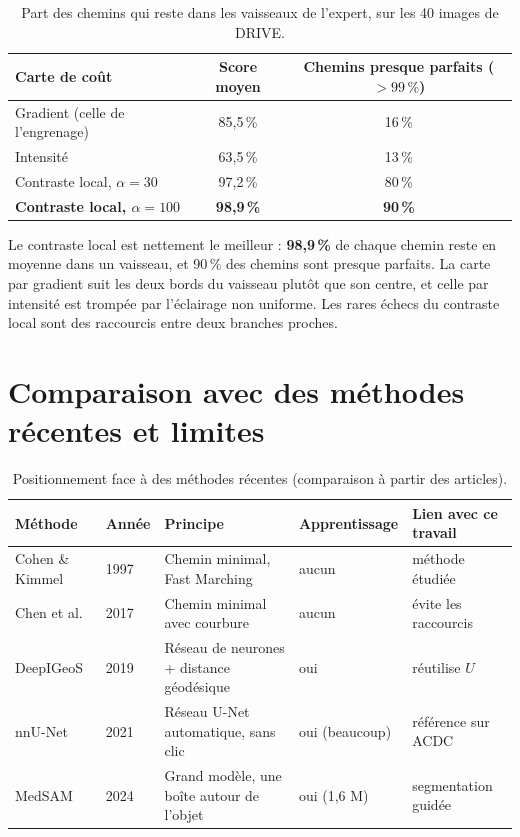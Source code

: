 \documentclass[11pt,a4paper]{article}
\begin{document}
\begin{table}[!h]
  \centering\small
  \begin{tabular}{lcc}
    \toprule
    Carte de coût & Score moyen & Chemins presque parfaits ($> 99\,\%$) \\
    \midrule
    Gradient (celle de l'engrenage) & 85,5\,\% & 16\,\% \\
    Intensité & 63,5\,\% & 13\,\% \\
    Contraste local, $\alpha = 30$ & 97,2\,\% & 80\,\% \\
    \textbf{Contraste local, $\alpha = 100$} & \textbf{98,9\,\%} & \textbf{90\,\%} \\
    \bottomrule
  \end{tabular}
  \caption{Part des chemins qui reste dans les vaisseaux de l'expert, sur les 40 images de DRIVE.}
  \label{tab:drive}
\end{table}

Le contraste local est nettement le meilleur : \textbf{98,9\,\%} de chaque chemin reste en moyenne dans un
vaisseau, et 90\,\% des chemins sont presque parfaits. La carte par gradient suit les deux bords du vaisseau
plutôt que son centre, et celle par intensité est trompée par l'éclairage non uniforme. Les rares échecs du
contraste local sont des raccourcis entre deux branches proches.

\clearpage
\section{Comparaison avec des méthodes récentes et limites}

\begin{table}[!htb]
  \centering\small
  \begin{tabular}{L{3.1cm}L{0.9cm}L{5.4cm}L{2.2cm}L{3.2cm}}
    \toprule
    Méthode & Année & Principe & Apprentissage & Lien avec ce travail \\
    \midrule
    Cohen \& Kimmel \cite{cohen97} & 1997 & Chemin minimal, Fast Marching & aucun & méthode étudiée \\
    Chen et al.\ \cite{chen17} & 2017 & Chemin minimal avec courbure & aucun & évite les raccourcis \\
    DeepIGeoS \cite{wang19} & 2019 & Réseau de neurones + distance géodésique & oui & réutilise $U$ \\
    nnU-Net \cite{isensee21} & 2021 & Réseau U-Net automatique, sans clic & oui (beaucoup) & référence sur ACDC \\
    MedSAM \cite{ma24} & 2024 & Grand modèle, une boîte autour de l'objet & oui (1,6 M) & segmentation guidée \\
    \bottomrule
  \end{tabular}
  \caption{Positionnement face à des méthodes récentes (comparaison à partir des articles).}
\end{table}
\end{document}
